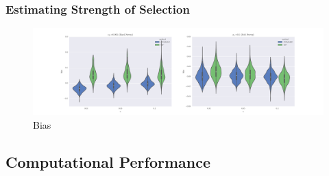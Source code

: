 \subsubsection{Estimating Strength of Selection}
\begin{figure}[H]
  \centering
    \includegraphics[width=\textwidth]{bias}
  \caption{Bias}
  \label{fig:Fig4}
\end{figure}

\subsection{Computational Performance}